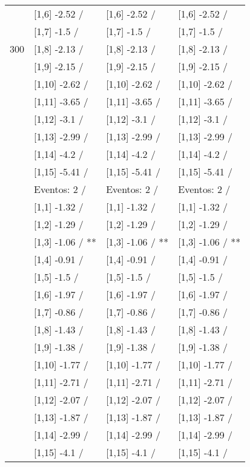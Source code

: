 \begin{table}
\begin{tabular}[t]{llll}
 & {}[1,6] -2.52  / & {}[1,6] -2.52  / & {}[1,6] -2.52  /\\
 & {}[1,7] -1.5  / & {}[1,7] -1.5  / & {}[1,7] -1.5  /\\
300 & {}[1,8] -2.13  / & {}[1,8] -2.13  / & {}[1,8] -2.13  /\\
\addlinespace
 & {}[1,9] -2.15  / & {}[1,9] -2.15  / & {}[1,9] -2.15  /\\
 & {}[1,10] -2.62  / & {}[1,10] -2.62  / & {}[1,10] -2.62  /\\
 & {}[1,11] -3.65  / & {}[1,11] -3.65  / & {}[1,11] -3.65  /\\
 & {}[1,12] -3.1  / & {}[1,12] -3.1  / & {}[1,12] -3.1  /\\
 & {}[1,13] -2.99  / & {}[1,13] -2.99  / & {}[1,13] -2.99  /\\
\addlinespace
 & {}[1,14] -4.2  / & {}[1,14] -4.2  / & {}[1,14] -4.2  /\\
 & {}[1,15] -5.41  / & {}[1,15] -5.41  / & {}[1,15] -5.41  /\\
 & Eventos:  2 / & Eventos:  2 / & Eventos:  2 /\\
 & {}[1,1] -1.32  / & {}[1,1] -1.32  / & {}[1,1] -1.32  /\\
 & {}[1,2] -1.29  / & {}[1,2] -1.29  / & {}[1,2] -1.29  /\\
\addlinespace
 & {}[1,3] -1.06  / ** & {}[1,3] -1.06  / ** & {}[1,3] -1.06  / **\\
 & {}[1,4] -0.91  / & {}[1,4] -0.91  / & {}[1,4] -0.91  /\\
 & {}[1,5] -1.5  / & {}[1,5] -1.5  / & {}[1,5] -1.5  /\\
 & {}[1,6] -1.97  / & {}[1,6] -1.97  / & {}[1,6] -1.97  /\\
 & {}[1,7] -0.86  / & {}[1,7] -0.86  / & {}[1,7] -0.86  /\\
\addlinespace
500 & {}[1,8] -1.43  / & {}[1,8] -1.43  / & {}[1,8] -1.43  /\\
 & {}[1,9] -1.38  / & {}[1,9] -1.38  / & {}[1,9] -1.38  /\\
 & {}[1,10] -1.77  / & {}[1,10] -1.77  / & {}[1,10] -1.77  /\\
 & {}[1,11] -2.71  / & {}[1,11] -2.71  / & {}[1,11] -2.71  /\\
 & {}[1,12] -2.07  / & {}[1,12] -2.07  / & {}[1,12] -2.07  /\\
\addlinespace
 & {}[1,13] -1.87  / & {}[1,13] -1.87  / & {}[1,13] -1.87  /\\
 & {}[1,14] -2.99  / & {}[1,14] -2.99  / & {}[1,14] -2.99  /\\
 & {}[1,15] -4.1  / & {}[1,15] -4.1  / & {}[1,15] -4.1  /\\
\bottomrule
\end{tabular}
\end{table}
